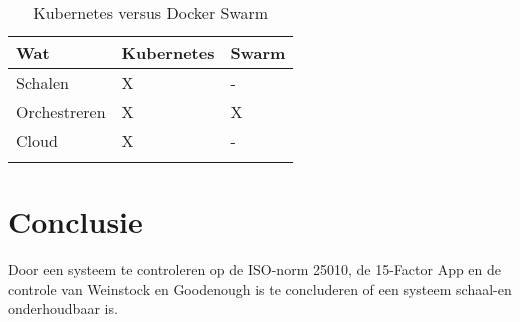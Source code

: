 \begin{table}[h]
	\caption{Kubernetes versus Docker Swarm}
	\label{tab:LoadScalability}
	\centering
	\begin{tabular}{p{2cm} p{3.5cm} p{3.5cm}}
		\toprule
		\textbf{Wat} & \textbf{Kubernetes} & \textbf{Swarm} \\
		\midrule
		Schalen & X & - \\
		Orchestreren & X & X \\
		Cloud & X & - \\
		\bottomrule\\
	\end{tabular}
\end{table}

\section{Conclusie}

Door een systeem te controleren op de ISO-norm 25010, de 15-Factor App en de controle van Weinstock en Goodenough is te concluderen of een systeem schaal-en onderhoudbaar is.